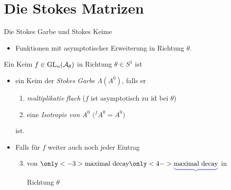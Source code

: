 \section{Die Stokes Matrizen}
\begin{frame}{Die Stokes Garbe und Stokes Keime}
  \begin{defn}
    \vspace{-3em}
    \begin{flushright}
      \begin{minipage}{.55\textwidth}
        \begin{itemize}
        \item[\tikzmarkc{n1}{blue}] Funktionen mit asymptotischer Erweiterung
          in Richtung $\theta$.
        \end{itemize}
      \end{minipage}
    \end{flushright}
    \begin{flushright}
    \end{flushright}
    \vspace{-2em}
    Ein Keim $f\in\Gl_n(\overset{\tikzmark{e1}}{\cA_\theta})$ in Richtung
    $\theta\in S^1$ ist
    \begin{itemize}
    \item ein Keim der \emph{Stokes Garbe \boldmath$\Lambda(A^0)$}, falls er
      \begin{enumerate}
      \item\emph{multiplikativ flach} ($f$ ist asymptotisch zu $\operatorname{id}$ bei
        $\theta$) 
      \item<2-> eine \emph{Isotropie von \boldmath$A^0$} $\bigl({}^fA^0=A^0\bigr)$
      \end{enumerate}
      ist.
    \item<3-> Falls für $f$ weiter auch noch jeder Eintrag
      \begin{enumerate}
        \setcounter{enumi}{2}
      \item von
        \emph{$\underset{\tikzmarkt{e2}}{%
              \only<-3>{%
                \textcolor{white}{\underbrace{\text{%
                      \textcolor{black}{maximal decay}}}}
              }
              \only<4->{%
                \textcolor{blue!50!white}{\underbrace{\text{%
                      \textcolor{black}{maximal decay}}}}
              }
            }$
          }
          in Richtung $\theta$
\end{enumerate}
\end{itemize}
\end{defn}
\end{frame}
